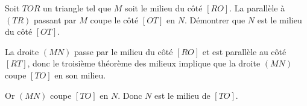 \begin{example}
Soit $TOR$ un triangle tel que $M$ soit le milieu du côté $[RO]$. La parallèle à $(TR)$ passant par $M$ coupe le côté $[OT]$ en $N$. Démontrer que $N$ est le milieu du côté $[OT]$.    

\begin{center}
   
\end{center}

La droite \( (MN)\) passe par le milieu du côté \( [RO]\) et est parallèle au côté \( [RT]\), donc le troisième théorème des milieux implique que la droite \( (MN)\) coupe \( [TO]\) en son milieu.

Or \( (MN)\) coupe \( [TO]\) en \( N\). Donc \( N\) est le milieu de \( [TO]\).

\end{example}

